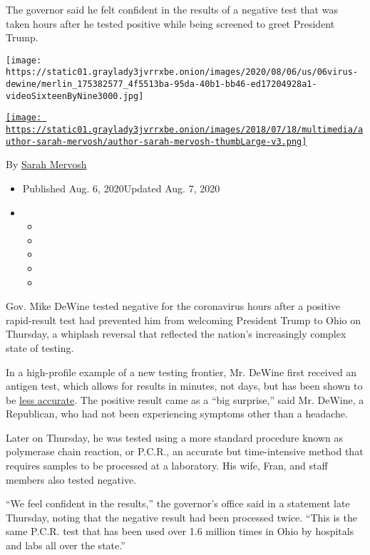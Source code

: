The governor said he felt confident in the results of a negative test
that was taken hours after he tested positive while being screened to
greet President Trump.

\texttt{[image: https://static01.graylady3jvrrxbe.onion/images/2020/08/06/us/06virus-dewine/merlin\_175382577\_4f5513ba-95da-40b1-bb46-ed17204928a1-videoSixteenByNine3000.jpg]}

\href{https://www.nytimes3xbfgragh.onion/by/sarah-mervosh}{\texttt{[image: https://static01.graylady3jvrrxbe.onion/images/2018/07/18/multimedia/author-sarah-mervosh/author-sarah-mervosh-thumbLarge-v3.png]}}

By \href{https://www.nytimes3xbfgragh.onion/by/sarah-mervosh}{Sarah
Mervosh}

\begin{itemize}
\item
  Published Aug. 6, 2020Updated Aug. 7, 2020
\item
  \begin{itemize}
  \item
  \item
  \item
  \item
  \item
  \end{itemize}
\end{itemize}

Gov. Mike DeWine tested negative for the coronavirus hours after a
positive rapid-result test had prevented him from welcoming President
Trump to Ohio on Thursday, a whiplash reversal that reflected the
nation's increasingly complex state of testing.

In a high-profile example of a new testing frontier, Mr. DeWine first
received an antigen test, which allows for results in minutes, not days,
but has been shown to be
\href{https://www.nytimes3xbfgragh.onion/2020/08/06/health/rapid-Covid-tests.html}{less
accurate}. The positive result came as a ``big surprise,'' said Mr.
DeWine, a Republican, who had not been experiencing symptoms other than
a headache.

Later on Thursday, he was tested using a more standard procedure known
as polymerase chain reaction, or P.C.R., an accurate but time-intensive
method that requires samples to be processed at a laboratory. His wife,
Fran, and staff members also tested negative.

``We feel confident in the results,'' the governor's office said in a
statement late Thursday, noting that the negative result had been
processed twice. ``This is the same P.C.R. test that has been used over
1.6 million times in Ohio by hospitals and labs all over the state.''

